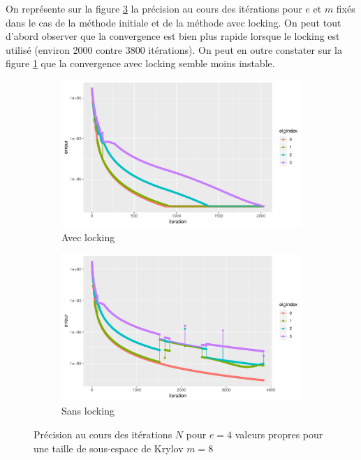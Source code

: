 \documentclass[11pt,a4paper]{article}
\begin{document}
		On représente sur la figure \ref{fig:comp_locks} la précision au cours des itérations pour $e$ et $m$ fixés dans le cas de la méthode initiale et de la méthode avec locking. On peut tout d'abord observer que la convergence est bien plus rapide lorsque le locking est utilisé (environ 2000 contre 3800 itérations). On peut en outre constater sur la figure \ref{wlock_e4_p8_m8} que la convergence avec locking semble moins instable.

		\begin{figure}
			\centering
			\begin{subfigure}{0.49\linewidth}
				\centering
				\includegraphics[width=\linewidth, keepaspectratio]{plots/wlock_e4_p8_m8.pdf}
				\caption{Avec locking\label{wlock_e4_p8_m8}}
			\end{subfigure}
			\begin{subfigure}{0.49\linewidth}
				\centering
				\includegraphics[width=\linewidth, keepaspectratio]{plots/wolock_e4_p8_m8.pdf}
				\caption{Sans locking\label{wolock_e4_p8_m8}}
			\end{subfigure}
			\caption{Précision au cours des itérations $N$ pour $e = 4$ valeurs propres pour une taille de sous-espace de Krylov $m=8$\label{fig:comp_locks}}
		\end{figure}
\end{document}
